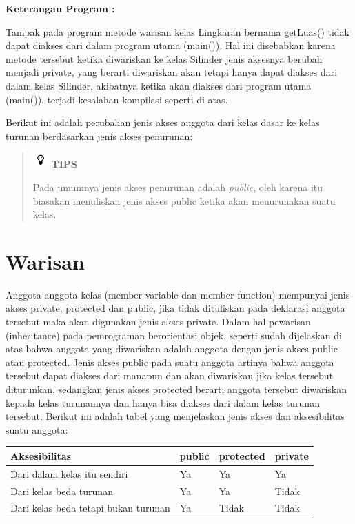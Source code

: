 \textbf{Keterangan Program :}

Tampak pada program metode warisan kelas Lingkaran bernama getLuas()
tidak dapat diakses dari dalam program utama (main()). Hal ini
disebabkan karena metode tersebut ketika diwariskan ke kelas Silinder
jenis aksesnya berubah menjadi private, yang berarti diwariskan akan
tetapi hanya dapat diakses dari dalam kelas Silinder, akibatnya ketika
akan diakses dari program utama (main()), terjadi kesalahan kompilasi
seperti di atas.

Berikut ini adalah perubahan jenis akses anggota dari kelas dasar ke
kelas turunan berdasarkan jenis akses penurunan:

\begin{quotation}
\includegraphics{images/tips}	\textbf{TIPS} 
	
	Pada
	umumnya jenis akses penurunan adalah \emph{public}, oleh karena itu
	biasakan menuliskan jenis akses public ketika akan menurunakan suatu
	kelas.
\end{quotation}
 

\section{Warisan}\label{warisan}

Anggota-anggota kelas (member variable dan member function) mempunyai
jenis akses private, protected dan public, jika tidak dituliskan pada
deklarasi anggota tersebut maka akan digunakan jenis akses private.
Dalam hal pewarisan (inheritance) pada pemrograman berorientasi objek,
seperti sudah dijelaskan di atas bahwa anggota yang diwariskan adalah
anggota dengan jenis akses public atau protected. Jenis akses public
pada suatu anggota artinya bahwa anggota tersebut dapat diakses dari
manapun dan akan diwariskan jika kelas tersebut diturunkan, sedangkan
jenis akses protected berarti anggota tersebut diwariskan kepada kelas
turunannya dan hanya bisa diakses dari dalam kelas turunan tersebut.
Berikut ini adalah tabel yang menjelaskan jenis akses dan aksesibilitas
suatu anggota:

\begin{longtable}[]{@{}llll@{}}
\toprule
Aksesibilitas & public & protected & private\tabularnewline
\midrule
\endhead
Dari dalam kelas itu sendiri & Ya & Ya & Ya\tabularnewline
Dari kelas beda turunan & Ya & Ya & Tidak\tabularnewline
Dari kelas beda tetapi bukan turunan & Ya & Tidak & Tidak\tabularnewline
\bottomrule
\end{longtable}

